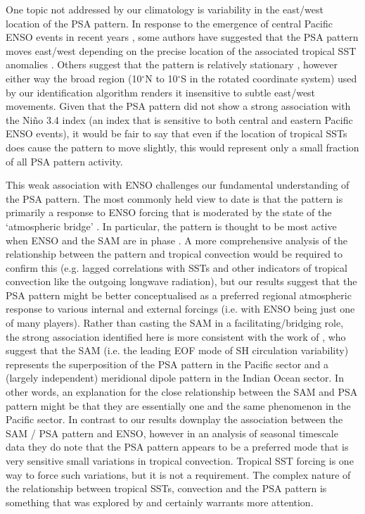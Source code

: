 One topic not addressed by our climatology is variability in the east/west location of the PSA pattern. In response to the emergence of central Pacific ENSO events in recent years \citep[e.g.][]{Ashok2007}, some authors have suggested that the PSA pattern moves east/west depending on the precise location of the associated tropical SST anomalies \citep[e.g.][]{Sun2013,WilsonBromwich2014,Ciasto2015}. Others suggest that the pattern is relatively stationary \citep[e.g.][]{Liu2007,Ding2012}, however either way the broad region (10$^{\circ}$N to 10$^{\circ}$S in the rotated coordinate system) used by our identification algorithm renders it insensitive to subtle east/west movements. Given that the PSA pattern did not show a strong association with the Ni\~{n}o 3.4 index (an index that is sensitive to both central and eastern Pacific ENSO events), it would be fair to say that even if the location of tropical SSTs does cause the pattern to move slightly, this would represent only a small fraction of all PSA pattern activity. 

This weak association with ENSO challenges our fundamental understanding of the PSA pattern. The most commonly held view to date is that the pattern is primarily a response to ENSO forcing \citep[e.g.][]{Mo2001} that is moderated by the state of the `atmospheric bridge' \citep{Liu2007}. In particular, the pattern is thought to be most active when ENSO and the SAM are in phase \citep{Fogt2006}. A more comprehensive analysis of the relationship between the pattern and tropical convection would be required to confirm this (e.g. lagged correlations with SSTs and other indicators of tropical convection like the outgoing longwave radiation), but our results suggest that the PSA pattern might be better conceptualised as a preferred regional atmospheric response to various internal and external forcings (i.e. with ENSO being just one of many players). Rather than casting the SAM in a facilitating/bridging role, the strong association identified here is more consistent with the work of \citet{Ding2012}, who suggest that the SAM (i.e. the leading EOF mode of SH circulation variability) represents the superposition of the PSA pattern in the Pacific sector and a (largely independent) meridional dipole pattern in the Indian Ocean sector. In other words, an explanation for the close relationship between the SAM and PSA pattern might be that they are essentially one and the same phenomenon in the Pacific sector. In contrast to \citet{Ding2012} our results downplay the association between the SAM / PSA pattern and ENSO, however in an analysis of seasonal timescale data they do note that the PSA pattern appears to be a preferred mode that is very sensitive small variations in tropical convection. Tropical SST forcing is one way to force such variations, but it is not a requirement. The complex nature of the relationship between tropical SSTs, convection and the PSA pattern is something that was explored by \citet{Harangozo2004} and certainly warrants more attention.  

